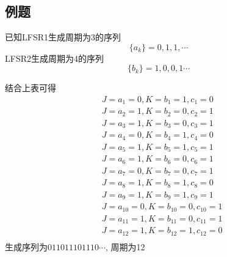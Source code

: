 \documentclass[UTF8]{ctexart}
\begin{document}
\subsection{例题}
已知LFSR1生成周期为3的序列
$$\{a_k\}=0,1,1,\cdots$$
LFSR2生成周期为4的序列
$$\{b_k\}=1,0,0,1\cdots$$

结合上表可得
$$
\begin{aligned}
  &J=a_1=0, K=b_1=1, c_1=0\\
  &J=a_2=1, K=b_2=0, c_2=1\\
  &J=a_3=1, K=b_3=0, c_3=1\\
  &J=a_4=0, K=b_4=1, c_4=0\\
  &J=a_5=1, K=b_5=1, c_5=1\\
  &J=a_6=1, K=b_6=0, c_6=1\\
  &J=a_7=0, K=b_7=0, c_7=1\\
  &J=a_8=1, K=b_8=1, c_8=0\\
  &J=a_9=1, K=b_9=1, c_9=1\\
  &J=a_{10}=0, K=b_{10}=0, c_{10}=1\\
  &J=a_{11}=1, K=b_{11}=0, c_{11}=1\\
  &J=a_{12}=1, K=b_{12}=1, c_{12}=0\\
\end{aligned}
$$
生成序列为$011011101110\cdots$, 周期为12
\end{document}
